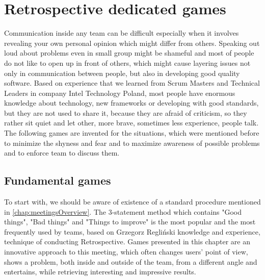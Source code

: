 \chapter{Retrospective dedicated games}
Communication inside any team can be difficult especially when it involves revealing your own personal opinion which might differ from others. Speaking out loud about problems even in small group might be shameful and most of people do not like to open up in front of others, which might cause layering issues not only in communication between people, but also in developing good quality software. Based on experience that we learned from Scrum Masters and Technical Leaders in company Intel Technology Poland, most people have enormous knowledge about technology, new frameworks or developing with good standards, but they are not used to share it, because they are afraid of criticism, so they rather sit quiet and let other, more brave, sometimes less experience, people talk. 
The following games are invented for the situations, which were mentioned before to minimize the shyness and fear and to maximize awareness of possible problems and to enforce team to discuss them.

\section{Fundamental games}
\label{s:fundGames}
To start with, we should be aware of existence of a standard procedure mentioned in \autoref{chap:meetingsOverview}. The 3-statement method which contains "Good things", "Bad things" and "Things to improve" is the most popular and the most frequently used by teams, based on Grzegorz Regliński knowledge and experience, technique of conducting Retrospective. Games presented in this chapter are an innovative approach to this meeting, which often changes users' point of view, shows a problem, both inside and outside of the team, from a different angle and entertains, while retrieving interesting and impressive results. 

